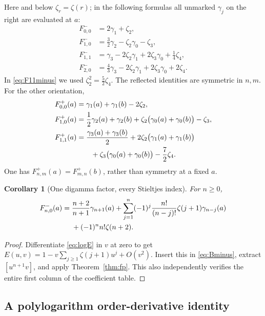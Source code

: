 \documentclass[11pt]{article}
\numberwithin{equation}{section}
\newtheorem{corollary}[theorem]{Corollary}
\theoremstyle{definition}\newtheorem{definition}[theorem]{Definition}
\theoremstyle{remark}\newtheorem{remark}[theorem]{Remark}
\begin{document}
Here and below $\zeta_r=\zeta(r)$; in the following formulas all unmarked
$\gamma_j$ on the right are evaluated at $a$:
\begin{align}
 F^-_{0,0}&=2\gamma_1+\zeta_2,\label{eq:F00minus}\\
 F^-_{1,0}&=\frac32\gamma_2-\zeta_2\gamma_0-\zeta_3,\label{eq:F10minus}\\
 F^-_{1,1}&=\gamma_3-2\zeta_2\gamma_1+2\zeta_3\gamma_0
                         +\frac14\zeta_4,\label{eq:F11minus}\\
 F^-_{2,0}&=\frac43\gamma_3-2\zeta_2\gamma_1+2\zeta_3\gamma_0
                         +2\zeta_4.\label{eq:F20minus}
\end{align}
In \eqref{eq:F11minus} we used $\zeta_2^2=\tfrac52\zeta_4$.
The reflected identities are symmetric in $n,m$. For the other orientation,
\begin{align}
 F^+_{0,0}(a)&=\gamma_1(a)+\gamma_1(b)-2\zeta_2,
       \label{eq:F00plus}\\
 F^+_{1,0}(a)&=\frac12\gamma_2(a)+\gamma_2(b)
       +\zeta_2\bigl(\gamma_0(a)+\gamma_0(b)\bigr)-\zeta_3,
       \label{eq:F10plus}\\
 F^+_{1,1}(a)&=\frac{\gamma_3(a)+\gamma_3(b)}2
       +2\zeta_2\bigl(\gamma_1(a)+\gamma_1(b)\bigr)\notag\\
       &\qquad+\zeta_3\bigl(\gamma_0(a)+\gamma_0(b)\bigr)
                     -\frac72\zeta_4.\label{eq:F11plus}
\end{align}
One has $F^+_{n,m}(a)=F^+_{m,n}(b)$, rather than symmetry at a fixed $a$.

\begin{corollary}[One digamma factor, every Stieltjes index]
\label{cor:onedigamma}
For $n\ge0$,
\begin{align}\label{eq:onedigamma}
 F^-_{n,0}(a)={}&\frac{n+2}{n+1}\gamma_{n+1}(a)
 +\sum_{j=1}^{n}(-1)^j\frac{n!}{(n-j)!}
                 \zeta(j+1)\gamma_{n-j}(a)\notag\\
 &+(-1)^n n!\zeta(n+2).
\end{align}
\end{corollary}
\begin{proof}
Differentiate \eqref{eq:logE} in $v$ at zero to get
$E(u,v)=1-v\sum_{j\ge1}\zeta(j+1)u^j+O(v^2)$.
Insert this in \eqref{eq:Bminus}, extract $[u^{n+1}v]$, and apply
Theorem~\ref{thm:fp}. This also independently verifies the entire first
column of the coefficient table.
\end{proof}

\subsection{A polylogarithm order-derivative identity}
\end{document}
